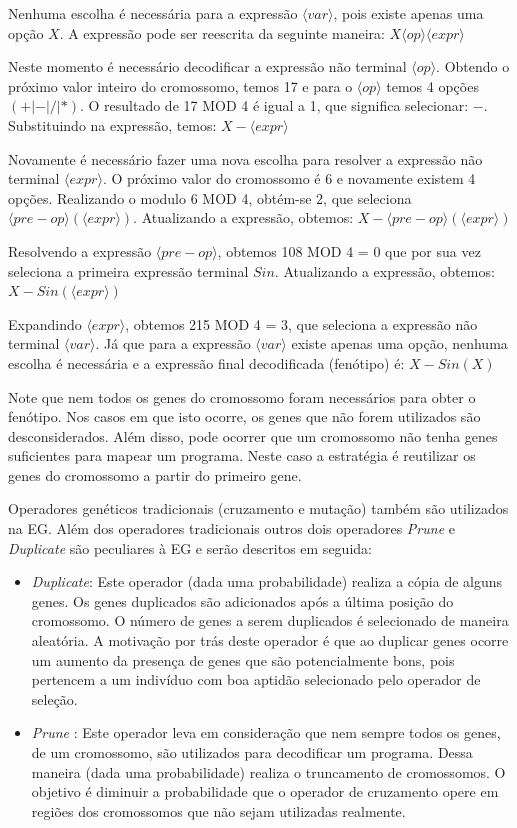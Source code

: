 Nenhuma escolha é necessária para a expressão $ \langle var \rangle$, pois existe apenas uma opção $X$. A expressão pode ser reescrita da seguinte maneira: $X \langle op \rangle \langle expr \rangle$

Neste momento é necessário decodificar a expressão não terminal $\langle op \rangle$. Obtendo o próximo valor inteiro do cromossomo, temos 17 e para o $ \langle op \rangle$ temos 4 opções $(+ | - | / | *)$. O resultado de 17 MOD 4  é igual a 1, que significa selecionar:  $-$. Substituindo na expressão, temos: $X  -  \langle expr \rangle$


Novamente é necessário fazer uma nova escolha para resolver a expressão não terminal $\langle expr \rangle$. O próximo valor do cromossomo é 6 e novamente existem 4 opções. Realizando o modulo 6 MOD 4, obtém-se 2, que seleciona $ \langle pre-op \rangle ( \langle expr \rangle)$. Atualizando a expressão, obtemos: $X - \langle pre-op \rangle (\langle expr \rangle)$

Resolvendo a expressão $ \langle pre-op \rangle$, obtemos 108 MOD 4 = 0 que por sua vez seleciona a primeira expressão  terminal $Sin$. Atualizando a expressão, obtemos: $X - Sin (\langle expr \rangle)$

Expandindo $ \langle expr \rangle$, obtemos 215 MOD 4 = 3, que seleciona a expressão não terminal $ \langle var \rangle$. Já que para a expressão $ \langle var \rangle$ existe apenas uma opção, nenhuma escolha é necessária e a expressão final decodificada (fenótipo) é: $X - Sin (X)$

Note que nem todos os genes do cromossomo foram necessários para obter o fenótipo. Nos casos em que isto ocorre, os genes que não forem utilizados são desconsiderados. Além disso, pode ocorrer que um cromossomo não tenha genes suficientes para mapear um programa. Neste caso a estratégia é reutilizar os genes do cromossomo a partir do primeiro gene. 

Operadores genéticos tradicionais (cruzamento e mutação) também são utilizados na EG. Além dos operadores tradicionais outros dois operadores \textit{Prune} e \textit{Duplicate} são peculiares à EG e serão descritos em seguida:

\begin{itemize}
	\item \textit{Duplicate}: Este operador (dada uma probabilidade) realiza a cópia de  alguns genes. Os genes duplicados são adicionados após a última posição do cromossomo. O número de genes a serem duplicados é selecionado de maneira aleatória. A motivação por trás deste operador é que ao duplicar genes ocorre um aumento da presença de genes que são potencialmente bons, pois pertencem a um indivíduo com boa aptidão selecionado pelo operador de seleção.
	\item \textit{Prune} : Este operador leva em consideração que nem sempre todos os genes, de um cromossomo, são utilizados para decodificar um programa. Dessa maneira (dada uma probabilidade) realiza o truncamento de  cromossomos. O objetivo é diminuir a probabilidade que o operador de cruzamento opere em regiões dos cromossomos que não sejam utilizadas realmente.
\end{itemize}



